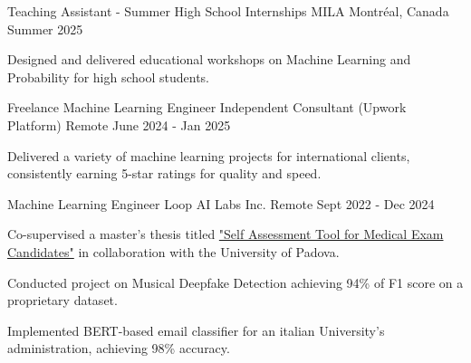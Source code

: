 

\begin{cventries}

    \cventry
    {Teaching Assistant - Summer High School Internships} %
    {MILA} %
    {Montréal, Canada} %
    {Summer 2025} %
    {
      \begin{cvitems} %
        \item {Designed and delivered educational workshops on Machine Learning and Probability for high school students.}
      \end{cvitems}
    }
    
    \cventry
    {Freelance Machine Learning Engineer} %
    {Independent Consultant (Upwork Platform)} %
    {Remote} %
    {June 2024 - Jan 2025} %
    {
      \begin{cvitems} %
        \item {Delivered a variety of machine learning projects for international clients, consistently earning 5-star ratings for quality and speed.}
      \end{cvitems}
    }

    \cventry
    {Machine Learning Engineer} %
    {Loop AI Labs Inc.} %
    {Remote} %
    {Sept 2022 - Dec 2024} %
    {
      \begin{cvitems} %
        \item {
        Co-supervised a master's thesis titled \href{https://thesis.unipd.it/handle/20.500.12608/70905}{"Self Assessment Tool for Medical Exam Candidates"} in collaboration with the University of Padova.
        }
        \item {Conducted project on Musical Deepfake Detection achieving 94\% of F1 score on a proprietary dataset.}
        \item {Implemented BERT-based email classifier for an italian University's administration, achieving 98\% accuracy.}
      \end{cvitems}
    } 


\end{cventries}

